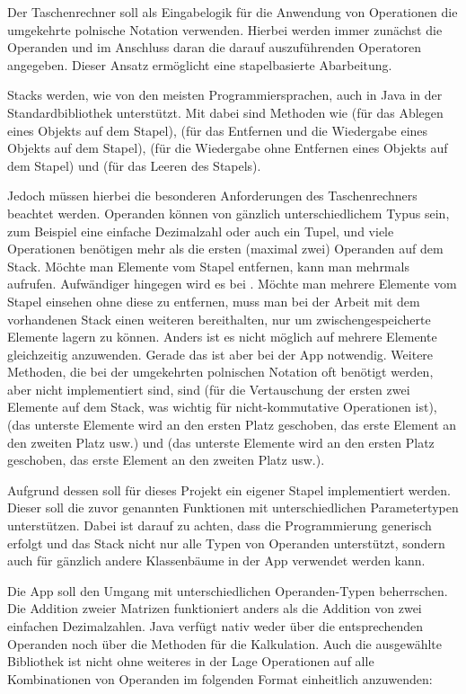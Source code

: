 Der Taschenrechner soll als Eingabelogik für die Anwendung von Operationen die umgekehrte polnische Notation verwenden. Hierbei werden immer zunächst die Operanden und im Anschluss daran die darauf auszuführenden Operatoren angegeben. Dieser Ansatz ermöglicht eine stapelbasierte Abarbeitung. 

Stacks werden, wie von den meisten Programmiersprachen, auch in Java in der Standardbibliothek unterstützt. Mit dabei sind Methoden wie  (für das Ablegen eines Objekts auf dem Stapel),  (für das Entfernen und die Wiedergabe eines Objekts auf dem Stapel),  (für die Wiedergabe ohne Entfernen eines Objekts auf dem Stapel) und  (für das Leeren des Stapels). 

Jedoch müssen hierbei die besonderen Anforderungen des Taschenrechners beachtet werden. Operanden können von gänzlich unterschiedlichem Typus sein, zum Beispiel eine einfache Dezimalzahl oder auch ein Tupel, und viele Operationen benötigen mehr als die ersten (maximal zwei) Operanden auf dem Stack. Möchte man Elemente vom Stapel entfernen, kann man  mehrmals aufrufen. Aufwändiger hingegen wird es bei . Möchte man mehrere Elemente vom Stapel einsehen ohne diese zu entfernen, muss man bei der Arbeit mit dem vorhandenen Stack einen weiteren bereithalten, nur um zwischengespeicherte Elemente lagern zu können. Anders ist es nicht möglich  auf mehrere Elemente gleichzeitig anzuwenden. Gerade das ist aber bei der App notwendig. Weitere Methoden, die bei der umgekehrten polnischen Notation oft benötigt werden, aber nicht implementiert sind, sind  (für die Vertauschung der ersten zwei Elemente auf dem Stack, was wichtig für nicht-kommutative Operationen ist),  (das unterste Elemente wird an den ersten Platz geschoben, das erste Element an den zweiten Platz usw.) und  (das unterste Elemente wird an den ersten Platz geschoben, das erste Element an den zweiten Platz usw.).

Aufgrund dessen soll für dieses Projekt ein eigener Stapel implementiert werden. Dieser soll die zuvor genannten Funktionen mit unterschiedlichen Parametertypen unterstützen. Dabei ist darauf zu achten, dass die Programmierung generisch erfolgt und das Stack nicht nur alle Typen von Operanden unterstützt, sondern auch für gänzlich andere Klassenbäume in der App verwendet werden kann.


Die App soll den Umgang mit unterschiedlichen Operanden-Typen beherrschen. Die Addition zweier Matrizen funktioniert anders als die Addition von zwei einfachen Dezimalzahlen. Java verfügt nativ weder über die entsprechenden Operanden noch über die Methoden für die Kalkulation. Auch die ausgewählte Bibliothek ist nicht ohne weiteres in der Lage Operationen auf alle Kombinationen von Operanden im folgenden Format einheitlich anzuwenden:

